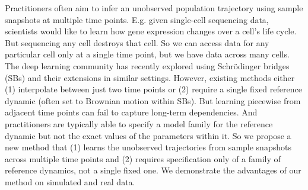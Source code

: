 Practitioners often aim to infer an unobserved population trajectory using sample snapshots at multiple time points. E.g. given single-cell sequencing data, scientists would like to learn how gene expression changes over a cell’s life cycle. But sequencing any cell destroys that cell. 
So we can access data for any particular cell only at a single time point, but we have data across many cells. The deep learning community has recently explored using Schrödinger bridges (SBs) and their extensions in similar settings. However, existing methods either (1) interpolate between just two time points or (2) require a single fixed reference dynamic (often set to Brownian motion within SBs). But learning piecewise from adjacent time points can fail to capture long-term dependencies. And practitioners are typically able to specify a model family for the reference dynamic but not the exact values of the parameters within it. So we propose a new method that (1) learns the unobserved trajectories from sample snapshots across multiple time points and (2) requires specification only of a family of reference dynamics, not a single fixed one. We demonstrate the advantages of our method on simulated and real data. %